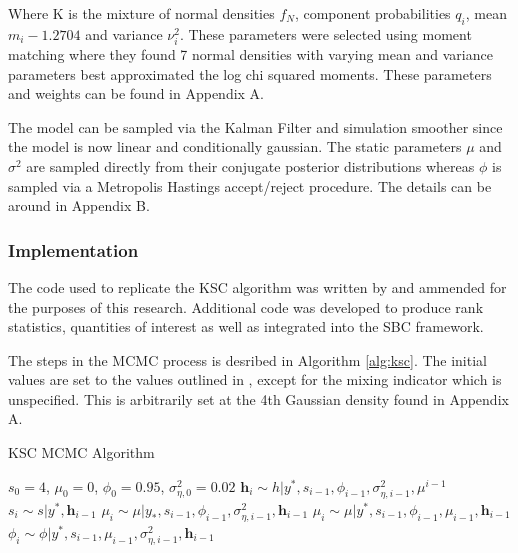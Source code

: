 \documentclass[12pt, a4paper]{article}
\begin{document}
        Where K is the mixture of normal densities $f_N$, component probabilities $q_i$, mean $m_i-1.2704$ and variance $\nu_i^2$. These parameters were selected using moment matching where they found 7 normal densities with varying mean and variance parameters best approximated the log chi squared moments. These parameters and weights can be found in Appendix A.

        The model can be sampled via the Kalman Filter and simulation smoother since the model is now linear and conditionally gaussian. The static parameters $\mu$ and $\sigma^2$ are sampled directly from their conjugate posterior distributions whereas $\phi$ is sampled via a Metropolis Hastings accept/reject procedure. The details can be around in Appendix B. 

        \subsubsection*{Implementation}
        The code used to replicate the KSC algorithm was written by \citet{chad2018} and ammended for the purposes of this research. Additional code was developed to produce rank statistics, quantities of interest as well as integrated into the SBC framework. 
        
        The steps in the MCMC process is desribed in Algorithm \ref{alg:ksc}. The initial values are set to the values outlined in \citet{kim1998stochastic}, except for the mixing indicator which is unspecified. This is arbitrarily set at the 4th Gaussian density found in Appendix A.

        \begin{algorithm}[H]
            \caption{KSC MCMC Algorithm}\label{alg:ksc}
            \begin{algorithmic}
            \Require $s_0 = 4$, $\mu_0 = 0$, $\phi_0 = 0.95$, $\sigma^{2}_{\eta,0} = 0.02$
                    \State {} $\boldsymbol{h}_i \sim h|y^{\ast}, s_{i-1}, \phi_{i-1}, \sigma^{2}_{\eta,i-1}, \mu^{i-1}$ 
                    \State {} $s_i \sim s|y^{\ast}, \boldsymbol{h}_{i-1}$
                    \State {} $\mu_i \sim \mu|y_{\ast}, s_{i-1}, \phi_{i-1}, \sigma^{2}_{\eta, i-1}, \boldsymbol{h}_{i-1}$
                    \State {} $\mu_i \sim \mu|y^{\ast}, s_{i-1}, \phi_{i-1}, \mu_{i-1}, \boldsymbol{h}_{i-1}$
                    \State {} $\phi_i \sim \phi|y^{\ast}, s_{i-1}, \mu_{i-1}, \sigma^{2}_{\eta, i-1}, \boldsymbol{h}_{i-1}$
                  \EndFor
            \end{algorithmic}
            \end{algorithm}
\end{document}
